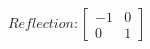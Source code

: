 \documentclass[preview]{standalone}
\begin{document}
\begin{align*}
Reflection: \begin{bmatrix} -1 & 0 \\ 0 & 1 \end{bmatrix}
\end{align*}
\end{document}
